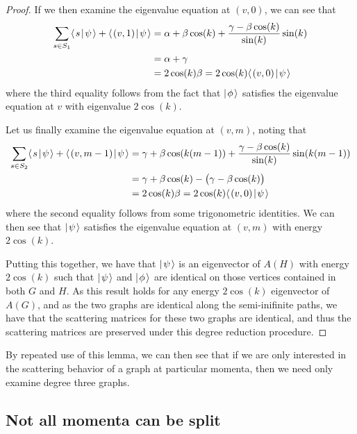 \documentclass[../thesis-main/thesis-main]{subfiles}
\begin{document}
\begin{proof}
  If we then examine the eigenvalue equation at $(v,0)$, we can see that
  \begin{align}
    \sum_{s\in S_1} \langle\mspace{2mu} s \mspace{2mu} | \mspace{2mu} \psi\mspace{2mu} \rangle + \langle\mspace{2mu} (v,1) \mspace{2mu} | \mspace{2mu} \psi\mspace{2mu} \rangle &= \alpha + \beta \cos(k) + \frac{\gamma - \beta \cos(k)}{\sin(k)} \sin (k) \\
      &= \alpha + \gamma \\
      &= 2 \cos(k) \beta = 2 \cos(k) \langle\mspace{2mu} (v,0) \mspace{2mu} | \mspace{2mu} \psi\mspace{2mu} \rangle
  \end{align}
  where the third equality follows from the fact that $|\mspace{2mu} \phi \mspace{2mu} \rangle$ satisfies the eigenvalue equation at $v$ with eigenvalue $2\cos(k)$. 
  
  Let us finally examine the eigenvalue equation at $(v,m)$, noting that
  \begin{align}
    \sum_{s\in S_2} \langle\mspace{2mu} s \mspace{2mu} | \mspace{2mu} \psi\mspace{2mu} \rangle + \langle\mspace{2mu} (v,m-1) \mspace{2mu} | \mspace{2mu} \psi\mspace{2mu} \rangle &=\gamma + \beta \cos(k (m-1)) + \frac{\gamma - \beta \cos(k)}{\sin(k)} \sin (k(m-1)) \\
      &= \gamma + \beta \cos(k)   -  \big(\gamma - \beta \cos(k)\big)\\
      &= 2 \cos(k) \beta = 2 \cos(k) \langle\mspace{2mu} (v,0) \mspace{2mu} | \mspace{2mu} \psi\mspace{2mu} \rangle
  \end{align}
  where the second equality follows from some trigonometric identities. We can then see that $|\mspace{2mu} \psi \mspace{2mu} \rangle$ satisfies the eigenvalue equation at $(v,m)$ with energy $2\cos(k)$.
  
  Putting this together, we have that $|\mspace{2mu} \psi \mspace{2mu} \rangle$ is an eigenvector of $A(H)$ with energy $2\cos(k)$ such that $|\mspace{2mu} \psi \mspace{2mu} \rangle$ and $|\mspace{2mu} \phi \mspace{2mu} \rangle$ are identical on those vertices contained in both $G$ and $H$.  As this result holds for any energy $2\cos(k)$ eigenvector of $A(G)$, and as the two graphs are identical along the semi-inifinite paths, we have that the scattering matrices for these two graphs are identical, and thus the scattering matrices are preserved under this degree reduction procedure.
\end{proof}

By repeated use of this lemma, we can then see that if we are only interested in the scattering behavior of a graph at particular momenta, then we need only examine degree three graphs.



\subsection{Not all momenta can be split}
\end{document}
